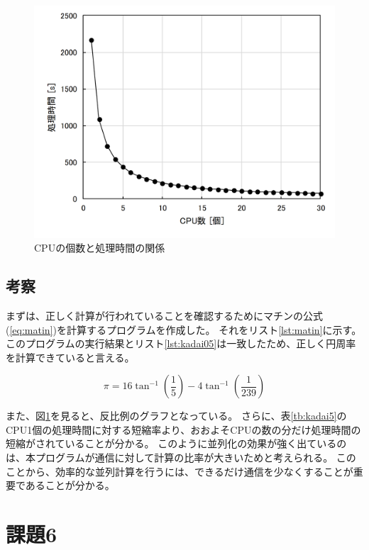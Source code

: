 \documentclass[a4j,titlepage]{jsarticle}
\begin{document}
\begin{figure}[H]
  \centering
  \includegraphics[width=12cm]{./MPI/kadai05-result/kadai05.png}
  \caption{CPUの個数と処理時間の関係}
  \label{fig:kadai5}
\end{figure}


\subsection{考察}
まずは、正しく計算が行われていることを確認するためにマチンの公式(\ref{eq:matin})を計算するプログラムを作成した。
それをリスト\ref{lst:matin}に示す。
このプログラムの実行結果とリスト\ref{lst:kadai05}は一致したため、正しく円周率を計算できていると言える。

\begin{equation}
  \pi = 16 \tan^{-1} \left( \frac{1}{5} \right) - 4 \tan^{-1} \left( \frac{1}{239} \right)
  \label{eq:matin}
\end{equation}



また、図\ref{fig:kadai5}を見ると、反比例のグラフとなっている。
さらに、表\ref{tb:kadai5}のCPU1個の処理時間に対する短縮率より、おおよそCPUの数の分だけ処理時間の短縮がされていることが分かる。
このように並列化の効果が強く出ているのは、本プログラムが通信に対して計算の比率が大きいためと考えられる。
このことから、効率的な並列計算を行うには、できるだけ通信を少なくすることが重要であることが分かる。


\section{課題6}
\end{document}

